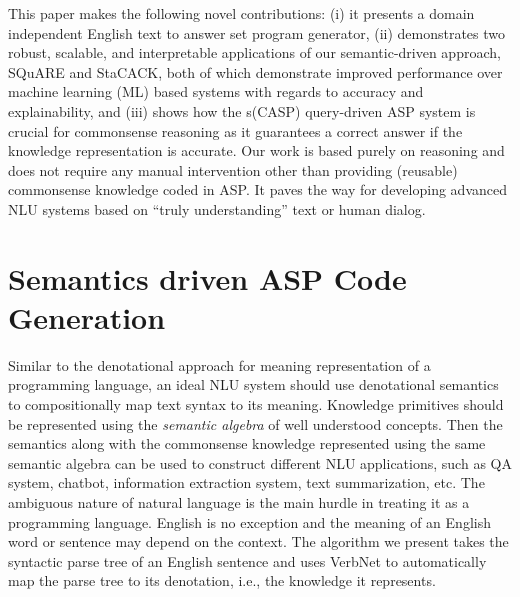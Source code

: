 \documentclass[letterpaper]{article}
\begin{document}
 
This paper makes the following novel contributions: (i) it presents a domain independent English text to answer set program generator, (ii) demonstrates two robust, scalable, and interpretable applications of our semantic-driven approach, SQuARE and StaCACK, both of which
demonstrate improved performance over machine learning (ML) based systems with regards to accuracy and explainability, 
and (iii) shows how the s(CASP) query-driven ASP system is crucial for commonsense reasoning as it guarantees a correct answer if the knowledge representation is accurate.
Our work is based purely on reasoning and does not require any manual intervention other than providing (reusable) commonsense knowledge coded in ASP. It paves the way for developing advanced NLU systems based on ``truly understanding''  text or human dialog. 
 
\section{Semantics driven ASP Code Generation} 
Similar to the denotational approach for meaning representation of a programming language, an ideal NLU system should use denotational semantics to compositionally map text syntax to its meaning. Knowledge primitives should be represented using the \textit{semantic algebra} \cite{d_semantics} of  well understood concepts. Then the semantics along with the commonsense knowledge represented using the same semantic algebra can be used to construct different NLU applications, such as QA system, chatbot, information extraction system, text summarization, etc. The ambiguous nature of natural language is the main hurdle in treating it as a programming language. English is no exception and the meaning of an English word or sentence may depend on the context. The algorithm we present takes the syntactic parse tree of an English sentence and uses VerbNet to automatically map the parse tree to its denotation, i.e., the knowledge it represents. 
\end{document}
